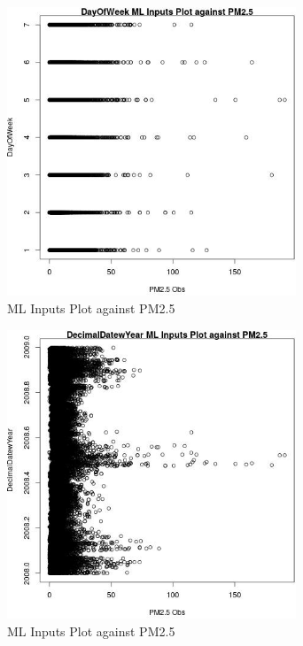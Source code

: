 \begin{figure} 
\centering  
\includegraphics[width=0.77\textwidth]{Code_Outputs/Report_ML_input_PM25_Step4_part_e_de_duplicated_aves_DayOfWeekvPM25_Obs.jpg} 
\caption{\label{fig:Report_ML_input_PM25_Step4_part_e_de_duplicated_avesDayOfWeekvPM25_Obs}ML Inputs Plot against PM2.5} 
\end{figure} 
 

\clearpage 

\begin{figure} 
\centering  
\includegraphics[width=0.77\textwidth]{Code_Outputs/Report_ML_input_PM25_Step4_part_e_de_duplicated_aves_DecimalDatewYearvPM25_Obs.jpg} 
\caption{\label{fig:Report_ML_input_PM25_Step4_part_e_de_duplicated_avesDecimalDatewYearvPM25_Obs}ML Inputs Plot against PM2.5} 
\end{figure} 
 

